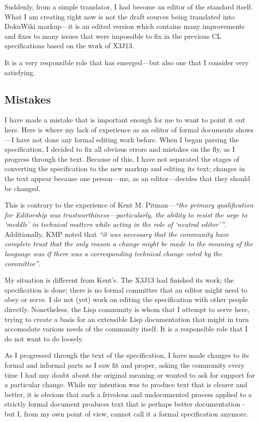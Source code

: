 Suddenly, from a simple translator, I had become an editor of the \cl{} standard itself. What I am creating right now is not the draft sources being translated into DokuWiki markup---it is an edited version which contains many improvements and fixes to many issues that were impossible to fix in the previous CL specifications based on the work of X3J13.

It is a very responsible role that has emerged---but also one that I consider very satisfying.

\subsection{Mistakes}

I have made a mistake that is important enough for me to want to point it out here. Here is where my lack of experience as an editor of formal documents shows---I have not done any formal editing work before. When I began parsing the specification, I decided to fix all obvious errors and mistakes on the fly, as I progress through the text. Because of this, I have not separated the stages of converting the specification to the new markup and editing its text; changes in the text appear because one person---me, as an editor---decides that they should be changed.

This is contrary to the experience of Kent M. Pitman---\textit{``the primary qualification for Editorship was trustworthi\-ness---particularly, the ability to resist the urge to `meddle' in technical matters while acting in the role of `neutral editor'''}.\cite{kmp:2012:untold} Additionally, KMP noted that \textit{``it was necessary that the community have complete trust that the only reason a change might be made to the meaning of the language was if there was a corresponding technical change voted by the committee''}.\cite{kmp:2012:untold}

My situation is different from Kent's. The X3J13 had finished its work; the specification is done; there is no formal committee that an editor might need to obey or serve.  I do not (yet) work on editing the specification with other people directly. Nonetheless, the Lisp community is whom that I attempt to serve here, trying to create a basis for an extensible Lisp documentation that might in turn accomodate various needs of the community itself. It is a responsible role that I do not want to do loosely.

As I progressed through the text of the specification, I have made changes to its formal and informal parts as I saw fit and proper, asking the community every time I had any doubt about the original meaning or wanted to ask for support for a particular change. While my intention was to produce text that is clearer and better, it is obvious that such a frivolous and undocumented process applied to a strictly formal document produces text that is perhaps better documentation - but I, from my own point of view, cannot call it a formal specification anymore.

